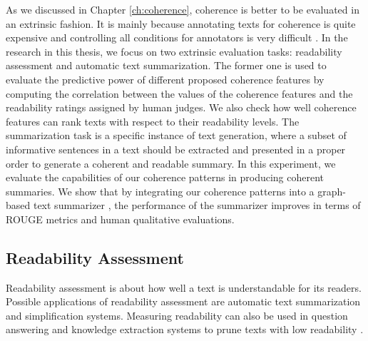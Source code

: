 As we discussed in Chapter \ref{ch:coherence}, coherence is better to be evaluated in an extrinsic fashion. 
It is mainly because annotating texts for coherence is quite expensive and controlling all conditions for annotators is very difficult \cite{karamanis04a}. 
In the research in this thesis, we focus on two extrinsic evaluation tasks: readability assessment and automatic text summarization. 
The former one is used to evaluate the predictive power of different proposed coherence features by computing the correlation between the values of the coherence features and the readability ratings assigned by human judges. 
We also check how well coherence features can rank texts with respect to their readability levels. 
The summarization task is a specific instance of text generation, where a subset of informative sentences in a text should be extracted and presented in a proper order to generate a coherent and readable summary. 
In this experiment, we evaluate the capabilities of our coherence patterns in producing coherent summaries. 
We show that by integrating our coherence patterns into a graph-based text summarizer \cite{parveen15a}, the performance of the summarizer improves in terms of ROUGE metrics and human qualitative evaluations.

\subsection{Readability Assessment}
\label{sec:readability_assessment}

Readability assessment is about how well a text is understandable for its readers.  
Possible applications of readability assessment are automatic text summarization and simplification systems. 
Measuring readability can also be used in question answering and knowledge extraction systems to prune texts with low readability \cite{kate10}. 

